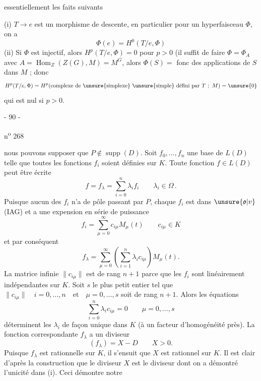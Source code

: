   essentiellement les faits suivants

(i) $T\longrightarrow e$ est un morphisme de descente, en particulier  pour un hyperfaisceau $\Phi$, on a
\[
\Phi(e)=H^0(T/e,\Phi)
\]
(ii) Si $\Phi$ est  injectif, alors $H^p(T/e,\Phi)=0$ pour $p>0$ (il suffit de faire $\Phi=\Phi_A$ avec $A=\operatorname{Hom}_{Z}(Z(G),M)=M^G$, alors $\Phi(S)=$ fonc des applications de $S$ dans $M$ ; donc
\[
H^p(T/e,\Phi)=H^p(\text{complexe de \unsure{simplexe} \unsure{simple} défini par }T\ ;\ M)=\unsure{0}
\]
qui est nul si $p>0$.
\begin{center}- 90 -\end{center}\hfill n\textsuperscript{o} 268

nous pouvons supposer que $P\notin\operatorname{supp}(D)$. Soit $f_0,\ldots,f_n$ une base de $L(D)$ telle que toutes les fonctions $f_i$ soient définies sur $K$. Toute fonction $f\in L(D)$ peut être écrite
\[
f=f_\lambda=\sum_{i=0}^n\lambda_i f_i\qquad\lambda_i\in\Omega\,.
\]
Puisque aucun des $f_i$ n'a de pôle passant par $P$, chaque $f_i$ est dans $\unsure{\mathfrak{o}|v}$ (IAG) et a une expension en série de puissance
\[
f_i=\sum_{\mu=0}^{\infty}c_{i\mu}M_\mu(t)\qquad c_{i\mu}\in K
\]
et par conséquent
\[
f_\lambda=\sum_{\mu=0}^{\infty}\left(\sum_{i=1}^n\lambda_i c_{i\mu}\right)M_\mu(t).
\]
La matrice infinie $\|c_{i\mu}\|$ est de rang $n+1$ parce que les $f_i$ sont linéairement indépendantes sur $K$. Soit $s$ le plus petit entier tel que $\|c_{i\mu}\|\quad i=0,\ldots,n\quad\text{et}\quad\mu=0,\ldots,s$ soit de rang $n+1$. Alors les équations
\[
\sum_{i=0}^n\lambda_i c_{i\mu}=0\qquad\mu=0,\ldots,s
\]
déterminent les $\lambda_i$ de façon unique dans $K$ (à un facteur d'homogénéité près). La fonction correspondante $f_\lambda$ a un diviseur
\[
(f_\lambda)=X-D\qquad X>0.
\]
Puisque $f_\lambda$ est rationnelle sur $K$, il s'ensuit que $X$ est rationnel sur $K$. Il est clair d'après la construction que le diviseur $X$ est le diviseur dont on a démontré l'unicité dans (i). Ceci démontre notre  

